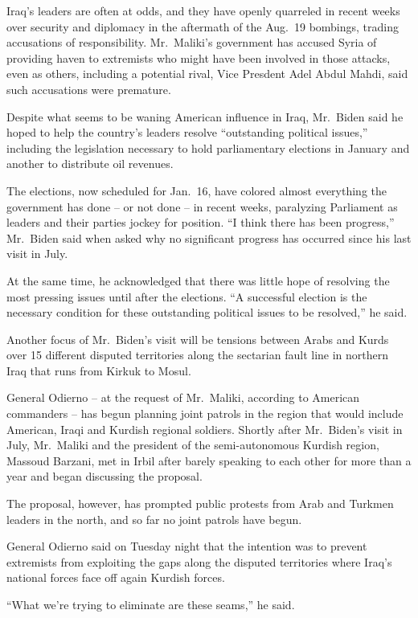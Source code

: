 ﻿\documentclass[12pt]{article}
\begin{document}
Iraq's leaders are often at odds, and they have openly quarreled in recent weeks over security and
diplomacy in the aftermath of the Aug.~19 bombings, trading accusations of responsibility.
Mr.~Maliki's government has accused Syria of providing haven to extremists who might have been
involved in those attacks, even as others, including a potential rival, Vice Presdent Adel Abdul
Mahdi, said such accusations were premature.

Despite what seems to be waning American influence in Iraq, Mr.~Biden said he hoped to help the
country's leaders resolve ``outstanding political issues,'' including the legislation necessary to
hold parliamentary elections in January and another to distribute oil revenues.

The elections, now scheduled for Jan.~16, have colored almost everything the government has done --
or not done -- in recent weeks, paralyzing Parliament as leaders and their parties jockey for
position. ``I think there has been progress,'' Mr.~Biden said when asked why no significant progress
has occurred since his last visit in July.

At the same time, he acknowledged that there was little hope of resolving the most pressing issues
until after the elections. ``A successful election is the necessary condition for these outstanding
political issues to be resolved,'' he said.

Another focus of Mr.~Biden's visit will be tensions between Arabs and Kurds over 15 different
disputed territories along the sectarian fault line in northern Iraq that runs from Kirkuk to Mosul.

General Odierno -- at the request of Mr.~Maliki, according to American commanders -- has begun
planning joint patrols in the region that would include American, Iraqi and Kurdish regional
soldiers. Shortly after Mr.~Biden's visit in July, Mr.~Maliki and the president of the
semi-autonomous Kurdish region, Massoud Barzani, met in Irbil after barely speaking to each other
for more than a year and began discussing the proposal.

The proposal, however, has prompted public protests from Arab and Turkmen leaders in the north, and
so far no joint patrols have begun.

General Odierno said on Tuesday night that the intention was to prevent extremists from exploiting
the gaps along the disputed territories where Iraq's national forces face off again Kurdish forces.

``What we're trying to eliminate are these seams,'' he said.
\end{document}
